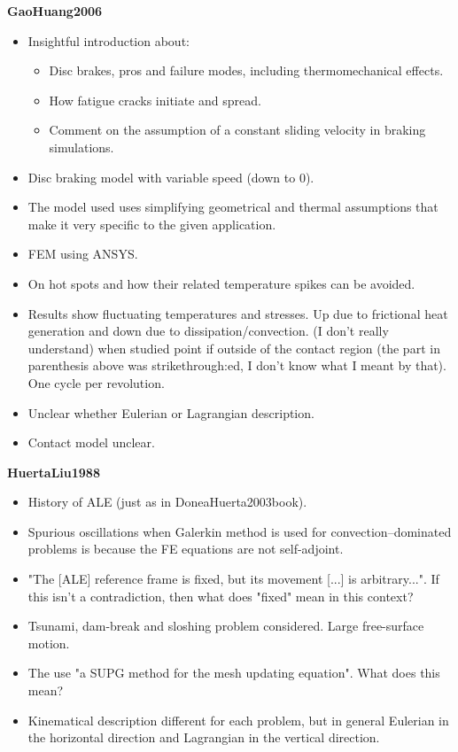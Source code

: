 \documentclass{article}
\begin{document}
\textbf{GaoHuang2006}
\begin{itemize}
\item Insightful introduction about:
\begin{itemize}
\item Disc brakes, pros and failure modes, including thermomechanical effects.
\item How fatigue cracks initiate and spread.
\item Comment on the assumption of a constant sliding velocity in braking simulations.
\end{itemize}
\item Disc braking model with variable speed (down to 0).
\item The model used uses simplifying geometrical and thermal assumptions that make it very specific to the given application.
\item FEM using ANSYS.
\item On hot spots and how their related temperature spikes can be avoided.
\item Results show fluctuating temperatures and stresses. Up due to frictional heat generation and down due to dissipation/convection. (I don't really understand) when studied point if outside of the contact region (the part in parenthesis above was strikethrough:ed, I don't know what I meant by that). One cycle per revolution.
\item Unclear whether Eulerian or Lagrangian description.
\item Contact model unclear.
\end{itemize}


\textbf{HuertaLiu1988}
\begin{itemize}
\item History of ALE (just as in DoneaHuerta2003book).
\item Spurious oscillations when Galerkin method is used for convection--dominated problems is because the FE equations are not self-adjoint.
\item "The [ALE] reference frame is fixed, but its movement [...] is arbitrary...". If this isn't a contradiction, then what does "fixed" mean in this context?
\item Tsunami, dam-break and sloshing problem considered. Large free-surface motion.
\item The use "a SUPG method for the mesh updating equation". What does this mean?
\item Kinematical description different for each problem, but in general Eulerian in the horizontal direction and Lagrangian in the vertical direction.
\end{itemize}
\end{document}
